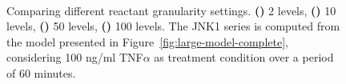 \begin{figure}[htpb]
\begin{minipage}{\textwidth}
\centering
{} \qquad
{} \\
 \qquad
{}
\caption{Comparing different reactant granularity settings. {\bfseries (\protect{})} 2 levels, {\bfseries (\protect{})} 10 levels,  {\bfseries (\protect{})} 50 levels, {\bfseries (\protect{})} 100 levels. The {\sf JNK1} series is computed from the model presented in Figure~\ref{fig:large-model-complete}, considering 100 ng/ml TNF$\alpha$ as treatment condition over a period of 60 minutes.}\label{fig:levels}
\end{minipage}
\end{figure}



